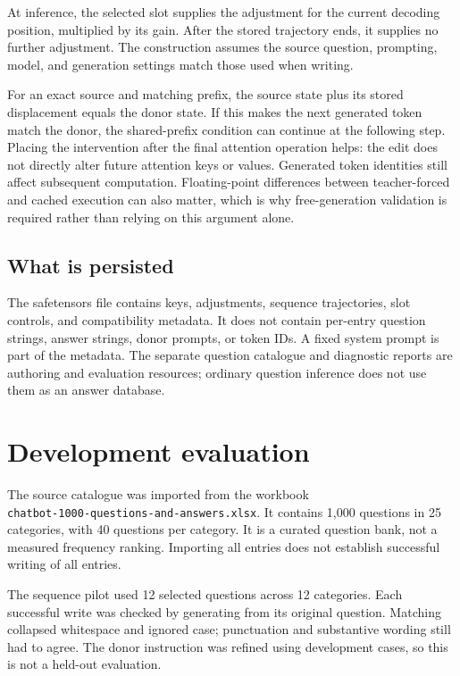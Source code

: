 \documentclass[manuscript,screen,nonacm]{acmart}
\begin{document}
At inference, the selected slot supplies the adjustment for the current decoding position, multiplied by its gain. After the stored trajectory ends, it supplies no further adjustment. The construction assumes the source question, prompting, model, and generation settings match those used when writing.

For an exact source and matching prefix, the source state plus its stored displacement equals the donor state. If this makes the next generated token match the donor, the shared-prefix condition can continue at the following step. Placing the intervention after the final attention operation helps: the edit does not directly alter future attention keys or values. Generated token identities still affect subsequent computation. Floating-point differences between teacher-forced and cached execution can also matter, which is why free-generation validation is required rather than relying on this argument alone.

\subsection{What is persisted}
The safetensors file contains keys, adjustments, sequence trajectories, slot controls, and compatibility metadata. It does not contain per-entry question strings, answer strings, donor prompts, or token IDs. A fixed system prompt is part of the metadata. The separate question catalogue and diagnostic reports are authoring and evaluation resources; ordinary question inference does not use them as an answer database.

\section{Development evaluation}
The source catalogue was imported from the workbook\\
\nolinkurl{chatbot-1000-questions-and-answers.xlsx}. It contains 1,000 questions in 25 categories, with 40 questions per category. It is a curated question bank, not a measured frequency ranking. Importing all entries does not establish successful writing of all entries.

The sequence pilot used 12 selected questions across 12 categories. Each successful write was checked by generating from its original question. Matching collapsed whitespace and ignored case; punctuation and substantive wording still had to agree. The donor instruction was refined using development cases, so this is not a held-out evaluation.
\end{document}
